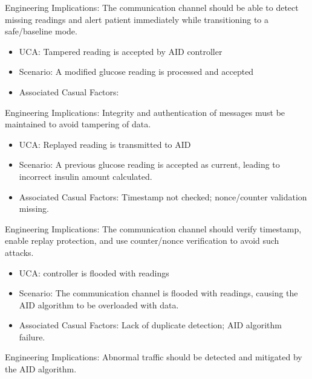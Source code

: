 \documentclass[conference]{IEEEtran}
\begin{document}
Engineering Implications: The communication channel should be able to detect missing readings and alert patient immediately while transitioning to a safe/baseline mode. \\
\vspace{.1cm}

\begin{itemize}
    \item UCA: Tampered reading is accepted by AID controller
    \item Scenario: A modified glucose reading is processed and accepted 
    \item Associated Casual Factors: 
\end{itemize}

Engineering Implications: Integrity and authentication of messages must be maintained to avoid tampering of data.\\
\vspace{.1cm}

\begin{itemize}
    \item UCA: Replayed reading is transmitted to AID
    \item Scenario: A previous glucose reading is accepted as current, leading to incorrect insulin amount calculated.
    \item Associated Casual Factors: Timestamp not checked; nonce/counter validation missing.
\end{itemize}

Engineering Implications: The communication channel should verify timestamp, enable replay protection, and use counter/nonce verification to avoid such attacks.\\
\vspace{.1cm}
\begin{itemize}
    \item UCA: controller is flooded with readings 
    \item Scenario: The communication channel is flooded with readings, causing the AID algorithm to be overloaded with data.
    \item Associated Casual Factors: Lack of duplicate detection; AID algorithm failure.
\end{itemize}

Engineering Implications: Abnormal traffic should be detected and mitigated by the AID algorithm.\\
\end{document}
